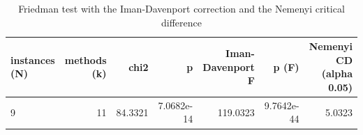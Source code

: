\begin{table}[htbp]
\centering
\small
\caption{Friedman test with the Iman-Davenport correction and the Nemenyi critical difference}
\label{tab:E6_scalability_b120_friedman_test}
\begin{tabular}{lrrrrrr}
\toprule
instances (N) & methods (k) & chi2 & p & Iman-Davenport F & p (F) & Nemenyi CD (alpha 0.05) \\
\midrule
9 & 11 & 84.3321 & 7.0682e-14 & 119.0323 & 9.7642e-44 & 5.0323 \\
\bottomrule
\end{tabular}
\end{table}
